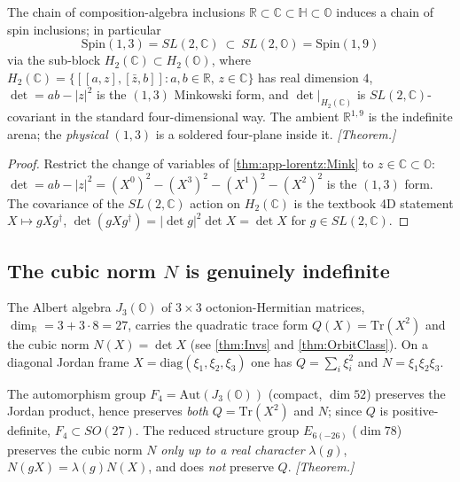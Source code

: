 \begin{theorem}
\label{thm:app-lorentz:SL2C}
The chain of composition-algebra inclusions
$\mathbb{R}\subset\mathbb{C}\subset\mathbb{H}\subset\mathbb{O}$ induces a chain of
spin inclusions; in particular
\begin{equation}
\label{eq:app-lorentz:c-in-o}
\mathrm{Spin}(1,3)=SL(2,\mathbb{C})\ \subset\ SL(2,\mathbb{O})=\mathrm{Spin}(1,9)
\end{equation}
via the sub-block $H_{2}(\mathbb{C})\subset H_{2}(\mathbb{O})$, where
$H_{2}(\mathbb{C})=\{[[a,z],[\bar{z},b]]:a,b\in\mathbb{R},\,z\in\mathbb{C}\}$ has
real dimension $4$, $\det=ab-|z|^{2}$ is the $(1,3)$ Minkowski form, and
$\det|_{H_{2}(\mathbb{C})}$ is $SL(2,\mathbb{C})$-covariant in the standard
four-dimensional way. The ambient $\mathbb{R}^{1,9}$ is the indefinite arena; the
\emph{physical} $(1,3)$ is a soldered four-plane inside it. \emph{[Theorem.]}
\end{theorem}

\begin{proof}
Restrict the change of variables of \autoref{thm:app-lorentz:Mink} to
$z\in\mathbb{C}\subset\mathbb{O}$: $\det=ab-|z|^{2}=(X^{0})^{2}-(X^{3})^{2}-(X^{1})^{2}-(X^{2})^{2}$
is the $(1,3)$ form. The covariance of the $SL(2,\mathbb{C})$ action on
$H_{2}(\mathbb{C})$ is the textbook 4D statement $X\mapsto gXg^{\dagger}$,
$\det(gXg^{\dagger})=|\det g|^{2}\det X=\det X$ for $g\in SL(2,\mathbb{C})$.
\end{proof}

\subsection{The cubic norm \texorpdfstring{$N$}{N} is genuinely indefinite}
\label{subsec:app-lorentz:cubic}

The Albert algebra $J_{3}(\mathbb{O})$ of $3\times3$ octonion-Hermitian matrices,
$\dim_{\mathbb{R}}=3+3\cdot8=27$, carries the quadratic trace form
$Q(X)=\mathrm{Tr}(X^{2})$ and the cubic norm $N(X)=\det X$
(see \autoref{thm:Invs} and \autoref{thm:OrbitClass}). On a diagonal Jordan frame
$X=\mathrm{diag}(\xi_{1},\xi_{2},\xi_{3})$ one has $Q=\sum_{i}\xi_{i}^{2}$ and
$N=\xi_{1}\xi_{2}\xi_{3}$.

\begin{theorem}
\label{thm:app-lorentz:groups}
The automorphism group $F_{4}=\mathrm{Aut}(J_{3}(\mathbb{O}))$ (compact, $\dim 52$)
preserves the Jordan product, hence preserves \emph{both} $Q=\mathrm{Tr}(X^{2})$ and
$N$; since $Q$ is positive-definite, $F_{4}\subset SO(27)$. The reduced structure
group $E_{6(-26)}$ ($\dim 78$) preserves the cubic norm $N$ \emph{only up to a real
character} $\lambda(g)$, $N(gX)=\lambda(g)N(X)$, and does \emph{not} preserve $Q$.
\emph{[Theorem.]}
\end{theorem}

